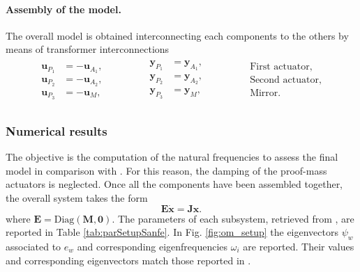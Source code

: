 \paragraph{Assembly of the model.} The overall model is obtained interconnecting each components to the others by means of transformer interconnections
\begin{align*}
\begin{aligned}
\mathbf{u}_{P_1} &= - \mathbf{u}_{A_1}, \\
\mathbf{u}_{P_2} &= - \mathbf{u}_{A_2}, \\
\mathbf{u}_{P_3} &= - \mathbf{u}_{M},
\end{aligned}\qquad \qquad
\begin{aligned}
\mathbf{y}_{P_1} &= \mathbf{y}_{A_1}, \\
\mathbf{y}_{P_2} &= \mathbf{y}_{A_2}, \\
\mathbf{y}_{P_3} &= \mathbf{y}_{M}, \\
\end{aligned}\qquad \qquad
\begin{aligned}
\text{First actuator}, \\
\text{Second actuator}, \\
\text{Mirror}. \\
\end{aligned}
\end{align*}



\subsubsection{Numerical results}
The objective is the computation of the natural frequencies to assess the final model in comparison with \cite{preda2020}. For this reason, the damping of the proof-mass actuators is neglected. Once all the components have been assembled together, the overall system takes the form
\begin{equation*}
\mathbf{E} \dot{ \mathbf{x} } = \mathbf{J}\mathbf{x}.
\end{equation*}
where $\mathbf{E} = \mathrm{Diag}(\mathbf{M}, \mathbf{0})$. The parameters of each subsystem, retrieved from \cite{sanfedino2019phd}, are reported in Table \ref{tab:parSetupSanfe}. In Fig. \ref{fig:om_setup} the eigenvectors $\psi_w$ associated to $e_w$ and corresponding eigenfrequencies $\omega_i$ are reported. Their values and corresponding eigenvectors match those reported in \cite{preda2020,sanfedino2019phd}.

